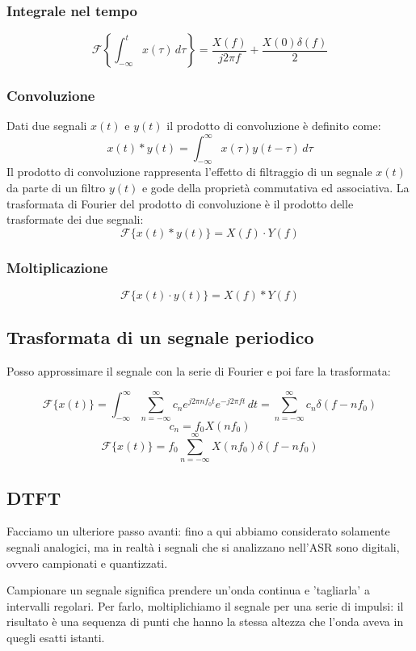 \documentclass[12pt, a4paper]{article}
\begin{document}
\subsubsection{Integrale nel tempo}
\[
  \mathcal{F}\left\{\int_{-\infty}^{t} x(\tau) \, d\tau\right\} = \frac{X(f)}{j 2\pi f}  + \frac{X(0)\delta (f)}{2}
\]

\subsubsection{Convoluzione}

Dati due segnali $x(t)$ e $y(t)$ il prodotto di convoluzione è definito come:
\[
  x(t) * y(t) = \int_{-\infty}^{\infty} x(\tau) y(t - \tau) \, d\tau
\]
Il prodotto di convoluzione rappresenta l'effetto di filtraggio di un segnale $x(t)$ da parte di un filtro $y(t)$ e gode della proprietà commutativa ed associativa.
La trasformata di Fourier del prodotto di convoluzione è il prodotto delle trasformate dei due segnali:
\[
  \mathcal{F}\{x(t) * y(t)\} = X(f) \cdot Y(f)
\]

\subsubsection{Moltiplicazione}
\[
  \mathcal{F}\{x(t) \cdot y(t)\} = X(f) * Y(f)
\]

\subsection{Trasformata di un segnale periodico}

Posso approssimare il segnale con la serie di Fourier e poi fare la trasformata:

\[
  \mathcal{F}\{x(t)\} = \int_{-\infty}^{\infty} \sum_{n=-\infty}^{\infty} c_n e^{j 2 \pi n f_0 t} e^{-j 2\pi f t} \, dt = \sum_{n=-\infty}^{\infty} c_n \delta (f- n f_0)
\]
\[
  c_n = f_0 X(n f_0)
\]
\[
  \mathcal{F}\{x(t)\} = f_0 \sum_{n=-\infty}^{\infty} X(n f_0) \delta (f- n f_0)
\]

\subsection{DTFT}
\vspace{0.5em}
Facciamo un ulteriore passo avanti: fino a qui abbiamo considerato solamente segnali analogici, ma in realtà i segnali che si analizzano nell'ASR sono digitali, ovvero campionati e quantizzati.

Campionare un segnale significa prendere un'onda continua e 'tagliarla' a intervalli regolari. Per farlo, moltiplichiamo il segnale per una serie di impulsi: il risultato è una sequenza di punti che hanno la stessa altezza che l'onda aveva in quegli esatti istanti.
\end{document}

